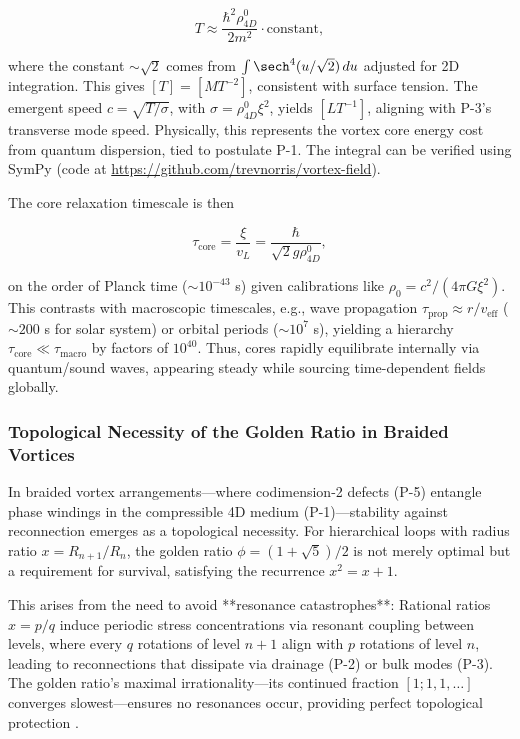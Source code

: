 \begin{equation}
T \approx \frac{\hbar^2 \rho_{4D}^0}{2 m^2} \cdot \text{constant},
\end{equation}

where the constant $\sim \sqrt{2}$ comes from $\int \sech^4(u / \sqrt{2}) \, du$ adjusted for 2D integration. This gives $[T] = [M T^{-2}]$, consistent with surface tension. The emergent speed $c = \sqrt{T / \sigma}$, with $\sigma = \rho_{4D}^0 \xi^2$, yields $[L T^{-1}]$, aligning with P-3's transverse mode speed. Physically, this represents the vortex core energy cost from quantum dispersion, tied to postulate P-1. The integral can be verified using SymPy (code at \url{https://github.com/trevnorris/vortex-field}).

The core relaxation timescale is then

\begin{equation}
\tau_{\text{core}} = \frac{\xi}{v_L} = \frac{\hbar}{\sqrt{2} g \rho_{4D}^0},
\end{equation}

on the order of Planck time ($\sim 10^{-43}$ s) given calibrations like $\rho_0 = c^2 / (4\pi G \xi^2)$. This contrasts with macroscopic timescales, e.g., wave propagation $\tau_{\text{prop}} \approx r / v_{\text{eff}}$ ($\sim 200$ s for solar system) or orbital periods ($\sim 10^7$ s), yielding a hierarchy $\tau_{\text{core}} \ll \tau_{\text{macro}}$ by factors of $10^{40}$. Thus, cores rapidly equilibrate internally via quantum/sound waves, appearing steady while sourcing time-dependent fields globally.

\subsubsection{Topological Necessity of the Golden Ratio in Braided Vortices}

In braided vortex arrangements—where codimension-2 defects (P-5) entangle phase windings in the compressible 4D medium (P-1)—stability against reconnection emerges as a topological necessity. For hierarchical loops with radius ratio $x = R_{n+1}/R_n$, the golden ratio $\phi = (1 + \sqrt{5})/2$ is not merely optimal but a requirement for survival, satisfying the recurrence $x^2 = x + 1$.

This arises from the need to avoid **resonance catastrophes**: Rational ratios $x = p/q$ induce periodic stress concentrations via resonant coupling between levels, where every $q$ rotations of level $n+1$ align with $p$ rotations of level $n$, leading to reconnections that dissipate via drainage (P-2) or bulk modes (P-3). The golden ratio’s maximal irrationality—its continued fraction $[1; 1, 1, \ldots]$ converges slowest—ensures no resonances occur, providing perfect topological protection \cite{vortex_dynamics, braid_topology}.


